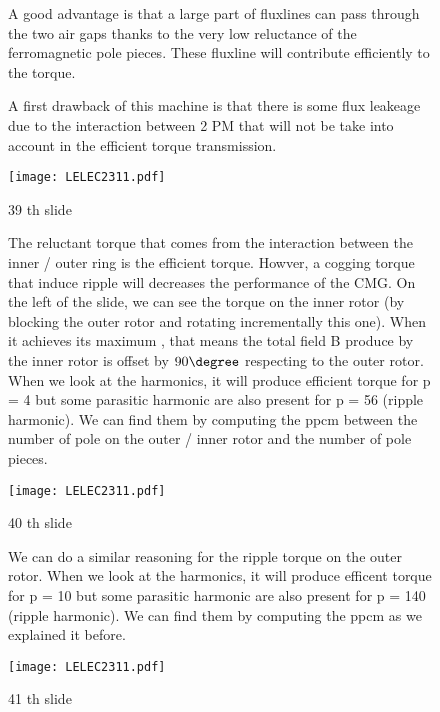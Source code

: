 \begin{figure}[H]
    \begin{minipage}{.45\linewidth}
    A good advantage is that a large part of fluxlines can pass through the two air gaps thanks to the very low reluctance of the ferromagnetic pole pieces. These fluxline will contribute efficiently to the torque.

 A first drawback of this machine is that there is some flux leakeage due to the interaction between 2 PM that will not be take into account in the efficient torque transmission.
 
       
    \end{minipage}
    \hfill%
    \begin{minipage}[c]{.45\linewidth}
        \centering
        \texttt{[image: LELEC2311.pdf]}
        \caption{39 th slide}
    \end{minipage}
\end{figure}

\begin{figure}[H]
    \begin{minipage}{.45\linewidth}
    The reluctant torque that comes from the interaction between the inner / outer ring is the efficient torque. Howver, a cogging torque that induce ripple will decreases the performance of the CMG.
    On the left of the slide, we can see the torque on the inner rotor (by blocking the outer rotor and rotating incrementally this one). When it achieves its maximum , that means the total field B produce by the inner rotor is offset by $90 \degree$ respecting to the outer rotor. When we look at the harmonics, it will produce efficient torque for p = 4 but some parasitic harmonic are also present for p = 56 (ripple harmonic). We can find them by computing the ppcm between the number of pole on the outer / inner rotor and the number of pole pieces.

 
       
    \end{minipage}
    \hfill%
    \begin{minipage}[c]{.45\linewidth}
        \centering
        \texttt{[image: LELEC2311.pdf]}
        \caption{40 th slide}
    \end{minipage}
\end{figure}

\begin{figure}[H]
    \begin{minipage}{.45\linewidth}
   We can do a similar reasoning for the ripple torque on the outer rotor.
   When we look at the harmonics, it will produce efficent torque for p = 10 but some parasitic harmonic are also present for p = 140 (ripple harmonic). We can find them by computing the ppcm as we explained it before.

 
       
    \end{minipage}
    \hfill%
    \begin{minipage}[c]{.45\linewidth}
        \centering
        \texttt{[image: LELEC2311.pdf]}
        \caption{41 th slide}
    \end{minipage}
\end{figure}

